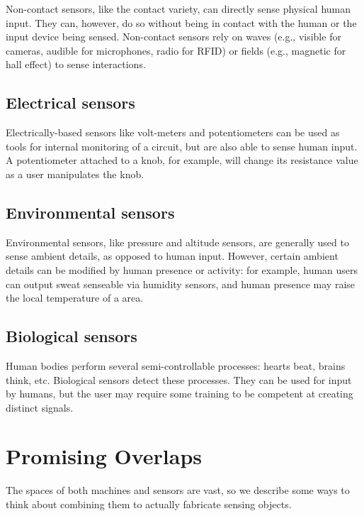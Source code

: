 Non-contact sensors, like the contact variety, can directly sense physical human input. They can, however, do so without being in contact with the human or the input device being sensed. Non-contact sensors rely on waves (e.g., visible for cameras, audible for microphones, radio for RFID) or fields (e.g., magnetic for hall effect) to sense interactions. 

\subsection{Electrical sensors}

Electrically-based sensors like volt-meters and potentiometers can be used as tools for internal monitoring of a circuit, but are also able to sense human input. A potentiometer attached to a knob, for example, will change its resistance value as a user manipulates the knob.

\subsection{Environmental sensors}

Environmental sensors, like pressure and altitude sensors, are generally used to sense ambient details, as opposed to human input. However, certain ambient details can be modified by human presence or activity: for example, human users can output sweat senseable via humidity sensors, and human presence may raise the local temperature of a area.

\subsection{Biological sensors}

Human bodies perform several semi-controllable processes: hearts beat, brains think, etc. Biological sensors detect these processes. They can be used for input by humans, but the user may require some training to be competent at creating distinct signals.

\section{Promising Overlaps}

The spaces of both machines and sensors are vast, so we describe some ways to think about combining them to actually fabricate sensing objects.

